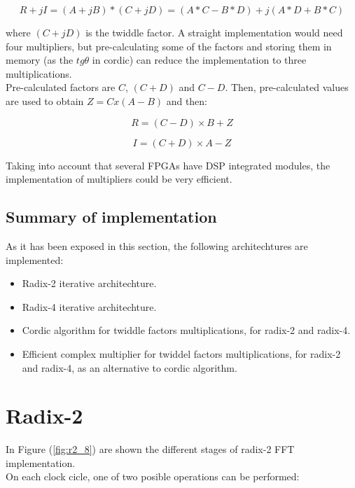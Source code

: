 \documentclass[conference]{IEEEtran}
\begin{document}
\begin{equation}
R+jI = (A+jB)*(C+jD) = (A*C-B*D) + j(A*D+B*C)
\label{eq:prodcomp4}
\end{equation}

where $(C+jD)$ is the twiddle factor. A straight implementation would need four multipliers, but pre-calculating some of the factors and 
storing them in memory (as the $tg\theta$ in cordic) can reduce the implementation to three multiplications.\\
Pre-calculated factors are $C$, $(C+D)$ and $C-D$. Then, pre-calculated values 
are used to obtain $Z = C x (A-B)$ and then:

\begin{equation}
R = (C-D) \times B + Z
\label{eq:prodcompR}
\end{equation}

\begin{equation}
I = (C+D) \times A - Z
\label{eq:prodcompI}
\end{equation}
 
Taking into account that several FPGAs have DSP integrated modules, the implementation of multipliers could be very efficient.

\subsection{Summary of implementation}

As it has been exposed in this section, the following architechtures are implemented:

\begin{itemize}
  \item Radix-2 iterative architechture.
  \item Radix-4 iterative architechture.
  \item Cordic algorithm for twiddle factors multiplications, for radix-2 and radix-4.
  \item Efficient complex multiplier for twiddel factors multiplications, for radix-2 and radix-4, as an alternative to 
  cordic algorithm.
\end{itemize} 

\section{Radix-2}

In Figure (\ref{fig:r2_8}) are shown the different stages of radix-2 FFT implementation.\\
On each clock cicle, one of two posible operations can be performed:
\end{document}
